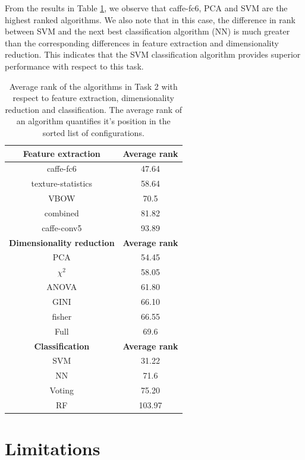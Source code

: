 From the results in Table \ref{table:average_rank2}, we observe that caffe-fc6, PCA and SVM are the highest ranked algorithms. We also note that in this case, the difference in rank between SVM and the next best classification algorithm (NN) is much greater than the corresponding differences in feature extraction and dimensionality reduction. This indicates that the SVM classification algorithm provides superior performance with respect to this task.

\begin{table}[ht!]
\centering
\caption{Average rank of the algorithms in Task 2 with respect to feature extraction, dimensionality reduction and classification. The average rank of an algorithm quantifies it's position in the sorted list of configurations.}
\begin{tabular}{ |c|c| } 
 \hline
 \textbf{Feature extraction} & \textbf{Average rank} \\ 
 \hline
 caffe-fc6 & 47.64\\
 \hline
texture-statistics & 58.64\\
 \hline
VBOW & 70.5 \\
 \hline
combined & 81.82\\
 \hline
caffe-conv5 & 93.89\\
 \hline
 \hline
 \textbf{Dimensionality reduction} & \textbf{Average rank} \\ 
 \hline
 PCA & 54.45\\
 \hline
$\chi^2$ & 58.05\\
\hline
ANOVA & 61.80\\
 \hline
GINI & 66.10\\
 \hline
 fisher & 66.55\\ 
 \hline
Full & 69.6 \\
 \hline
 \hline
 \textbf{Classification} & \textbf{Average rank} \\ 
 \hline
SVM & 31.22\\
 \hline
NN & 71.6\\
 \hline
Voting & 75.20 \\
 \hline
RF & 103.97\\
 \hline
 \end{tabular}
\label{table:average_rank2}
\end{table}


\section{Limitations}
\label{limitations}

